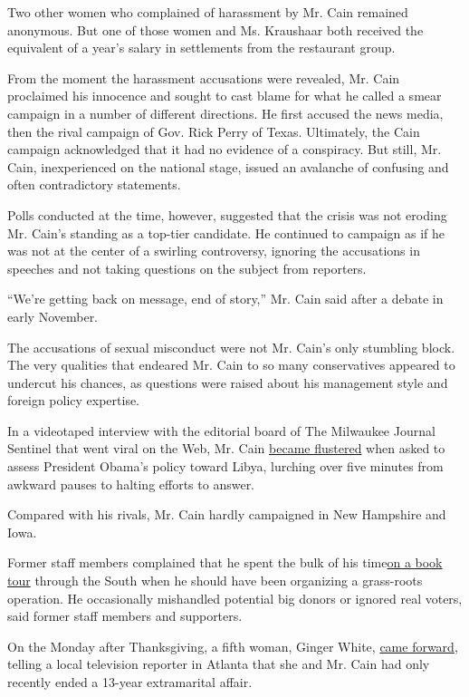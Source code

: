 Two other women who complained of harassment by Mr. Cain remained
anonymous. But one of those women and Ms. Kraushaar both received the
equivalent of a year's salary in settlements from the restaurant group.

From the moment the harassment accusations were revealed, Mr. Cain
proclaimed his innocence and sought to cast blame for what he called a
smear campaign in a number of different directions. He first accused the
news media, then the rival campaign of Gov. Rick Perry of Texas.
Ultimately, the Cain campaign acknowledged that it had no evidence of a
conspiracy. But still, Mr. Cain, inexperienced on the national stage,
issued an avalanche of confusing and often contradictory statements.

Polls conducted at the time, however, suggested that the crisis was not
eroding Mr. Cain's standing as a top-tier candidate. He continued to
campaign as if he was not at the center of a swirling controversy,
ignoring the accusations in speeches and not taking questions on the
subject from reporters.

``We're getting back on message, end of story,'' Mr. Cain said after a
debate in early November.

The accusations of sexual misconduct were not Mr. Cain's only stumbling
block. The very qualities that endeared Mr. Cain to so many
conservatives appeared to undercut his chances, as questions were raised
about his management style and foreign policy expertise.

In a videotaped interview with the editorial board of The Milwaukee
Journal Sentinel that went viral on the Web, Mr. Cain
\href{http://www.nytimes.com/2011/11/15/us/politics/herman-cain-libya-comments-draw-criticism.html}{became
flustered} when asked to assess President Obama's policy toward Libya,
lurching over five minutes from awkward pauses to halting efforts to
answer.

Compared with his rivals, Mr. Cain hardly campaigned in New Hampshire
and Iowa.

Former staff members complained that he spent the bulk of his
time\href{http://www.nytimes.com/2011/10/06/us/politics/gop-hopeful-herman-cain-on-book-tour-not-campaign-trail.html}{on
a book tour} through the South when he should have been organizing a
grass-roots operation. He occasionally mishandled potential big donors
or ignored real voters, said former staff members and supporters.

On the Monday after Thanksgiving, a fifth woman, Ginger White,
\href{http://thecaucus.blogs.nytimes.com/2011/11/28/cain-says-new-accuser-comes-forward/}{came
forward}, telling a local television reporter in Atlanta that she and
Mr. Cain had only recently ended a 13-year extramarital affair.

